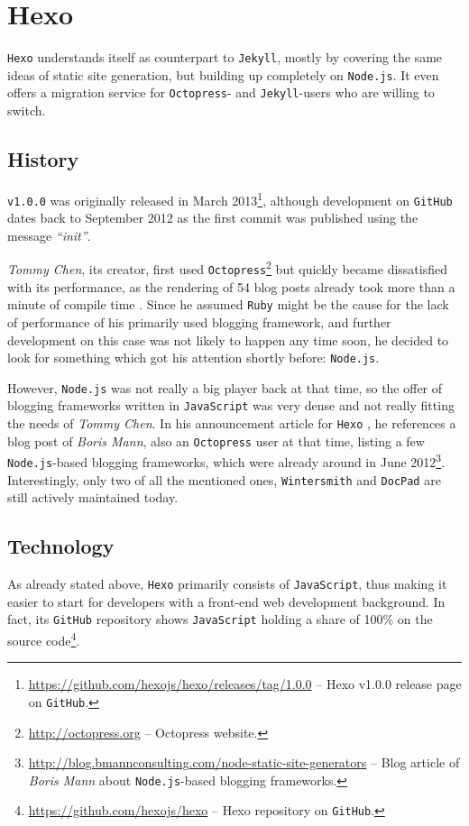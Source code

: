 \section{Hexo}
\label{sec:hexo}

\texttt{Hexo} understands itself as counterpart to \texttt{Jekyll}, mostly by covering the same ideas of static site generation, but building up completely on \texttt{Node.js}. It even offers a migration service for \texttt{Octopress}- and \texttt{Jekyll}-users who are willing to switch.

\subsection{History}
\label{sec:hexo-history}
\texttt{v1.0.0} was originally released in March 2013\footnote{\url{https://github.com/hexojs/hexo/releases/tag/1.0.0} -- Hexo v1.0.0 release page on \texttt{GitHub}.}, although development on \texttt{GitHub} dates back to September 2012 as the first commit was published using the message \emph{``init''}.

\emph{Tommy Chen}, its creator, first used \texttt{Octopress}\footnote{\url{http://octopress.org} -- Octopress website.} but quickly became dissatisfied with its performance, as the rendering of 54 blog posts already took more than a minute of compile time \cite{Chen2012hexodebut}. Since he assumed \texttt{Ruby} might be the cause for the lack of performance of his primarily used blogging framework, and further development on this case was not likely to happen any time soon, he decided to look for something which got his attention shortly before: \texttt{Node.js}.

However, \texttt{Node.js} was not really a big player back at that time, so the offer of blogging frameworks written in \texttt{JavaScript} was very dense and not really fitting the needs of \emph{Tommy Chen}. In his announcement article for \texttt{Hexo} \cite{Chen2012hexodebut}, he references a blog post of \emph{Boris Mann}, also an \texttt{Octopress} user at that time, listing a few \texttt{Node.js}-based blogging frameworks, which were already around in June 2012\footnote{\url{http://blog.bmannconsulting.com/node-static-site-generators} -- Blog article of \emph{Boris Mann} about \texttt{Node.js}-based blogging frameworks.}. Interestingly, only two of all the mentioned ones, \texttt{Wintersmith} and \texttt{DocPad} are still actively maintained today.

\subsection{Technology}
\label{sec:hexo-technology}
As already stated above, \texttt{Hexo} primarily consists of \texttt{JavaScript}, thus making it easier to start for developers with a front-end web development background. In fact, its \texttt{GitHub} repository shows \texttt{JavaScript} holding a share of 100\% on the source code\footnote{\url{https://github.com/hexojs/hexo} -- Hexo repository on \texttt{GitHub}.}.

